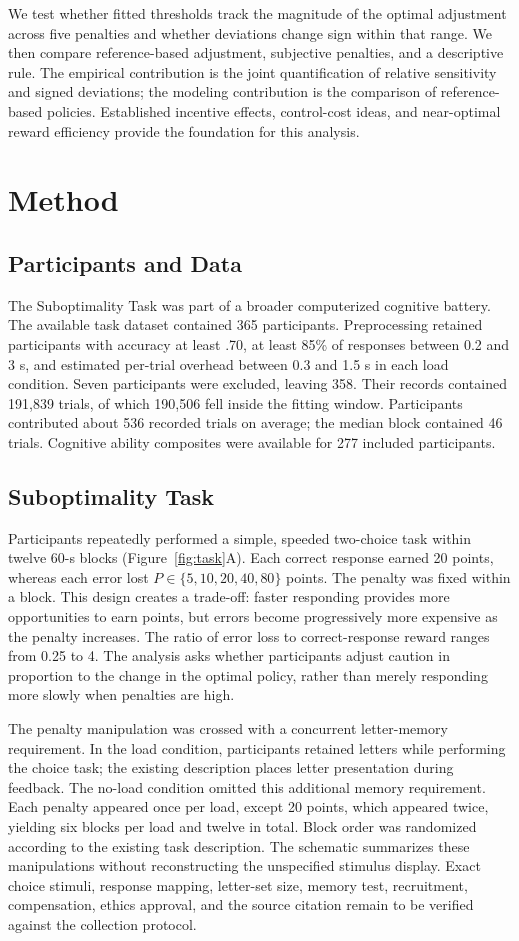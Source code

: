 \documentclass[10pt,letterpaper]{article}
\begin{document}
We test whether fitted thresholds track the magnitude of the optimal adjustment across five penalties and whether deviations change sign within that range. We then compare reference-based adjustment, subjective penalties, and a descriptive rule. The empirical contribution is the joint quantification of relative sensitivity and signed deviations; the modeling contribution is the comparison of reference-based policies. Established incentive effects, control-cost ideas, and near-optimal reward efficiency provide the foundation for this analysis.

\section{Method}
\subsection{Participants and Data}
The Suboptimality Task was part of a broader computerized cognitive battery. The available task dataset contained 365 participants. Preprocessing retained participants with accuracy at least .70, at least 85\% of responses between 0.2 and 3 s, and estimated per-trial overhead between 0.3 and 1.5 s in each load condition. Seven participants were excluded, leaving 358. Their records contained 191,839 trials, of which 190,506 fell inside the fitting window. Participants contributed about 536 recorded trials on average; the median block contained 46 trials. Cognitive ability composites were available for 277 included participants.

\subsection{Suboptimality Task}
Participants repeatedly performed a simple, speeded two-choice task within twelve 60-s blocks (Figure~\ref{fig:task}A). Each correct response earned 20 points, whereas each error lost $P\in\{5,10,20,40,80\}$ points. The penalty was fixed within a block. This design creates a trade-off: faster responding provides more opportunities to earn points, but errors become progressively more expensive as the penalty increases. The ratio of error loss to correct-response reward ranges from 0.25 to 4. The analysis asks whether participants adjust caution in proportion to the change in the optimal policy, rather than merely responding more slowly when penalties are high.

The penalty manipulation was crossed with a concurrent letter-memory requirement. In the load condition, participants retained letters while performing the choice task; the existing description places letter presentation during feedback. The no-load condition omitted this additional memory requirement. Each penalty appeared once per load, except 20 points, which appeared twice, yielding six blocks per load and twelve in total. Block order was randomized according to the existing task description. The schematic summarizes these manipulations without reconstructing the unspecified stimulus display. Exact choice stimuli, response mapping, letter-set size, memory test, recruitment, compensation, ethics approval, and the source citation remain to be verified against the collection protocol.
\end{document}
